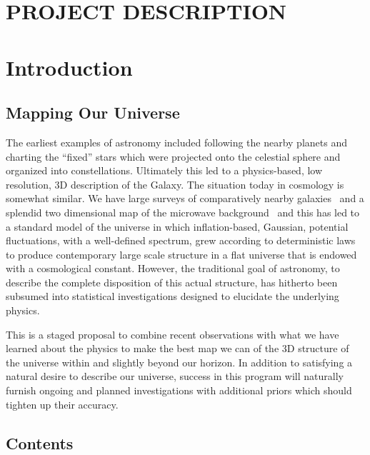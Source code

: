 \documentclass[psfig,11pt]{article}
\begin{document}
\section*{PROJECT DESCRIPTION}


\section{Introduction}

\subsection{Mapping Our Universe}

The earliest examples of astronomy included following the nearby planets and charting the ``fixed'' stars which were projected onto the celestial sphere and organized into constellations. Ultimately this led to a physics-based, low resolution,  3D description of the Galaxy. The situation today in cosmology is somewhat similar. We have large surveys of comparatively nearby galaxies~\cite{Kaiser2002, Ivezc2002, Davis2003, Giavalisco2004, DES2005, %
Skrutskie2006, Faber2007, Scoville2007, Kaiser2010, Blake2011, Alam2015} and a splendid two dimensional map of the microwave background~\cite{Planck2015maps} and this has led to a standard model of the universe in which inflation-based, Gaussian, potential fluctuations, with a well-defined spectrum, grew according to deterministic laws to produce contemporary large scale structure in a flat universe that is endowed with a cosmological constant. However, the traditional goal of astronomy, to describe the complete disposition of this actual structure, has hitherto been subsumed into statistical investigations designed to elucidate the underlying physics.

This is a staged proposal to combine recent observations with what we have learned about the physics to make the best map we can of the 3D structure of the universe within and slightly beyond our horizon. In addition to satisfying a natural desire to describe our universe, success in this program will naturally furnish ongoing and planned investigations with additional priors which should tighten up their accuracy.

\subsection{Contents}
\end{document}
